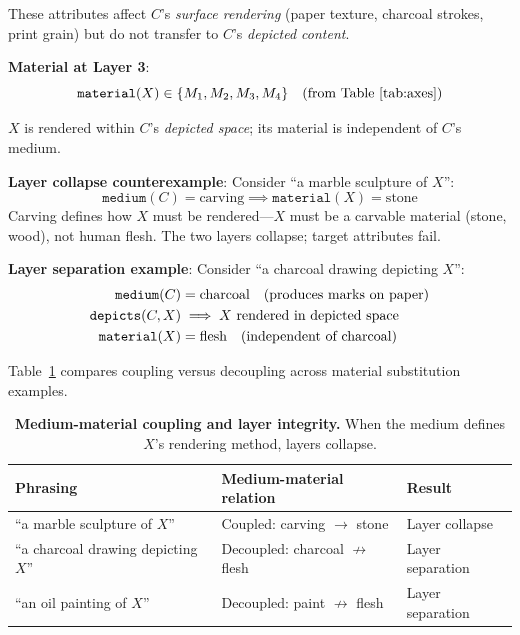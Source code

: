 These attributes affect $C$'s \emph{surface rendering} (paper texture, charcoal strokes, print grain) but do not transfer to $C$'s \emph{depicted content}.

\textbf{Material at Layer 3}:
\begin{equation}
\texttt{material}(X) \in \{M_1, M_2, M_3, M_4\} \quad \text{(from Table~\ref{tab:axes})}
\label{eq:xmaterial}
\end{equation}

$X$ is rendered within $C$'s \emph{depicted space}; its material is independent of $C$'s medium.

\textbf{Layer collapse counterexample}: Consider ``a marble sculpture of $X$'':
\begin{equation}
\texttt{medium}(C) = \text{carving} \implies \texttt{material}(X) = \text{stone}
\label{eq:collapse}
\end{equation}
Carving defines how $X$ must be rendered—$X$ must be a carvable material (stone, wood), not human flesh. The two layers collapse; target attributes fail.

\textbf{Layer separation example}: Consider ``a charcoal drawing depicting $X$'':
\begin{align}
\texttt{medium}(C) &= \text{charcoal} \quad \text{(produces marks on paper)} \notag \\
\texttt{depicts}(C, X) &\implies X \text{ rendered in depicted space} \notag \\
\texttt{material}(X) &= \text{flesh} \quad \text{(independent of charcoal)} \label{eq:separation}
\end{align}

Table~\ref{tab:mediumcoupling} compares coupling versus decoupling across material substitution examples.

\begin{table}[t]
\centering\small
\begin{tabular}{@{}p{}ll@{}}
\toprule
Phrasing & Medium-material relation & Result \\
\midrule
``a marble sculpture of $X$'' & Coupled: carving $\to$ stone & Layer collapse \\
``a charcoal drawing depicting $X$'' & Decoupled: charcoal $\not\to$ flesh & Layer separation \\
``an oil painting of $X$'' & Decoupled: paint $\not\to$ flesh & Layer separation \\
\bottomrule
\end{tabular}
\caption{\textbf{Medium-material coupling and layer integrity.} When the medium defines $X$'s rendering method, layers collapse.}
\label{tab:mediumcoupling}
\end{table}

